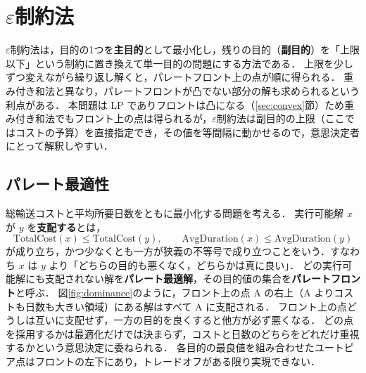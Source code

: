 \documentclass[a4paper,11pt]{ltjsarticle}
\newcommand{\cost}{\mathrm{TotalCost}}
\newcommand{\dur}{\mathrm{AvgDuration}}
\begin{document}
\section{\texorpdfstring{$\varepsilon$}{ε}制約法}\label{sec:eps}
$\varepsilon$制約法\cite{haimes1971,chankong1983}は，目的の1つを\textbf{主目的}として最小化し，残りの目的（\textbf{副目的}）を「上限以下」という制約に置き換えて単一目的の問題にする方法である．
上限を少しずつ変えながら繰り返し解くと，パレートフロント上の点が順に得られる．
重み付き和法と異なり，パレートフロントが凸でない部分の解も求められるという利点がある\cite{miettinen1999}．
本問題は LP でありフロントは凸になる（\ref{sec:convex}節）ため重み付き和法でもフロント上の点は得られるが，$\varepsilon$制約法は副目的の上限（ここではコストの予算）を直接指定でき，その値を等間隔に動かせるので，意思決定者にとって解釈しやすい．

\subsection{パレート最適性}\label{sec:pareto}
総輸送コストと平均所要日数をともに最小化する問題を考える．
実行可能解 $x$ が $y$ を\textbf{支配する}とは，
\begin{equation}
\cost(x)\le\cost(y),\qquad \dur(x)\le\dur(y)
\end{equation}
が成り立ち，かつ少なくとも一方が狭義の不等号で成り立つことをいう．すなわち $x$ は $y$ より「どちらの目的も悪くなく，どちらかは真に良い」．
どの実行可能解にも支配されない解を\textbf{パレート最適解}，その目的値の集合を\textbf{パレートフロント}と呼ぶ．
図\ref{fig:dominance}のように，フロント上の点 A の右上（A よりコストも日数も大きい領域）にある解はすべて A に支配される．
フロント上の点どうしは互いに支配せず，一方の目的を良くすると他方が必ず悪くなる．
どの点を採用するかは最適化だけでは決まらず，コストと日数のどちらをどれだけ重視するかという意思決定に委ねられる．
各目的の最良値を組み合わせたユートピア点はフロントの左下にあり，トレードオフがある限り実現できない．
\end{document}
